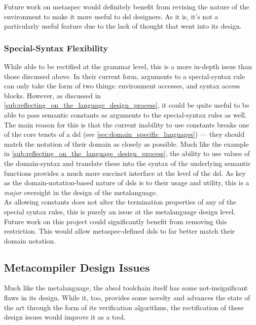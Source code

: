 Future work on \gls{metaspec} would definitely benefit from revising the nature of the environment to make it more useful to \gls{dsl} designers.
As it is, it's not a particularly useful feature due to the lack of thought that went into its design.


\subsubsection{Special-Syntax Flexibility} %
\label{ssub:special_syntax_flexibility}
While able to be rectified at the grammar level, this is a more in-depth issue than those discussed above. 
In their current form, arguments to a special-syntax rule can only take the form of two things: environment accesses, and syntax access blocks. 
However, as discussed in \autoref{sub:reflecting_on_the_language_design_process}, it could be quite useful to be able to pass semantic constants as arguments to the special-syntax rules as well.\\

The main reason for this is that the current inability to use constants breaks one of the core tenets of a dsl (see \autoref{sec:domain_specific_languages}) --- they should match the notation of their domain as closely as possible.
Much like the example in \autoref{sub:reflecting_on_the_language_design_process}, the ability to use values of the domain-syntax and translate these into the syntax of the underlying semantic functions provides a much more succinct interface at the level of the \gls{dsl}.
As key as the domain-notation-based nature of \glspl{dsl} is to their usage and utility, this is a \textit{major} oversight in the design of the metalanguage.\\

As allowing constants does not alter the termination properties of any of the special syntax rules, this is purely an issue at the metalanguage design level.
Future work on this project could significantly benefit from removing this restriction.
This would allow \gls{metaspec}-defined \glspl{dsl} to far better match their domain notation.



\subsection{Metacompiler Design Issues} %
\label{sub:metacompiler_design_issues}
Much like the metalanguage, the \gls{absol} toolchain itself has some not-insignificant flaws in its design. 
While it, too, provides some novelty and advances the state of the art through the form of its verification algorithms, the rectification of these design issues would improve it as a tool.

